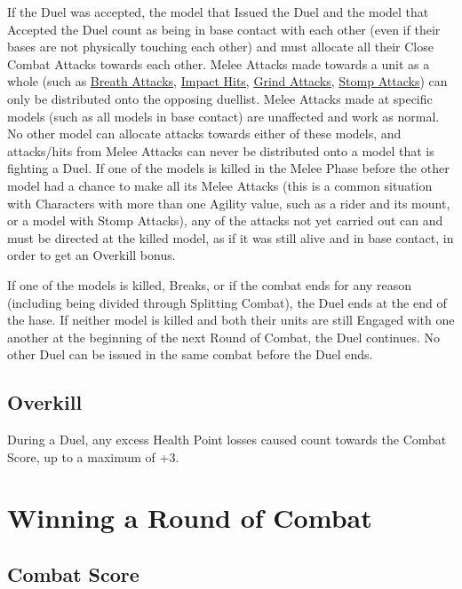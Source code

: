 If the Duel was accepted, the model that Issued the Duel and the model that Accepted the Duel count as being in base contact with each other (even if their bases are not physically touching each other) and must allocate all their Close Combat Attacks towards each other. Melee Attacks made towards a unit as a whole (such as \hyperref[breath_attack]{Breath Attacks}, \hyperref[impact_hits]{Impact Hits}, \hyperref[grind_attacks]{Grind Attacks}, \hyperref[stomp_attacks]{Stomp Attacks}) can only be distributed onto the opposing duellist. Melee Attacks made at specific models (such as all models in base contact) are unaffected and work as normal. No other model can allocate attacks towards either of these models, and attacks/hits from Melee Attacks can never be distributed onto a model that is fighting a Duel. If one of the models is killed in the Melee Phase before the other model had a chance to make all its Melee Attacks (this is a common situation with Characters with more than one Agility value, such as a rider and its mount, or a model with Stomp Attacks), any of the attacks not yet carried out can and must be directed at the killed model, as if it was still alive and in base contact, in order to get an Overkill bonus.
\par
If one of the models is killed, Breaks, or if the combat ends for any reason (including being divided through Splitting Combat), the Duel ends at the end of the hase. If neither model is killed and both their units are still Engaged with one another at the beginning of the next Round of Combat, the Duel continues. No other Duel can be issued in the same combat before the Duel ends. 

\subsection{Overkill}
\label{overkill}

During a Duel, any excess Health Point losses caused count towards the Combat Score, up to a maximum of +3.


\section{Winning a Round of Combat}
\label{winning_a_round_of_combat}

\subsection{Combat Score}

